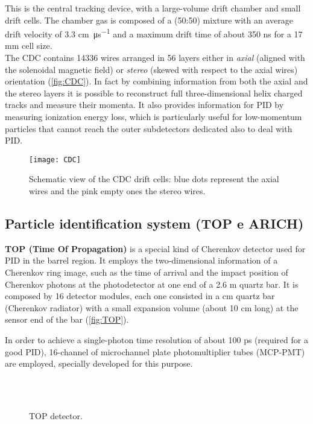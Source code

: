 This is the central tracking device, with a large-volume drift chamber and small drift cells. The chamber gas is composed of a  (50:50) mixture with an average drift velocity of 3.3 \unit{\centi\meter.\micro\second^{-1}} and a maximum drift time of about 350 ns for a 17 mm cell size.\\
The CDC contains 14336 wires arranged in 56 layers either in \emph{axial}  (aligned with the solenoidal magnetic field) or \emph{stereo} (skewed with respect to the axial wires) orientation (\autoref{fig:CDC}). 
In fact by combining information from both the axial and the stereo layers it is possible to reconstruct full three-dimensional helix charged tracks and measure their momenta.
It also provides information for PID by measuring ionization energy loss, which is particularly useful for low-momentum particles that cannot reach the outer subdetectors dedicated also to deal with PID.

\begin{figure}[h!]
\centering
\texttt{[image: CDC]}
\caption{Schematic view of the CDC drift cells: blue dots represent the axial wires and the pink empty ones the stereo wires.}
\label{fig:CDC}
\end{figure}


\subsection{Particle identification system (TOP e ARICH)}

\textbf{TOP (Time Of Propagation)} is a special kind of Cherenkov detector used for PID in the barrel region. It employs the two-dimensional information of a Cherenkov ring image, such as the time of arrival and the impact position of Cherenkov photons at the photodetector at one end of a 2.6 m quartz bar. It is composed by 16 detector modules, each one consisted in a  cm quartz bar (Cherenkov radiator) with a small expansion volume (about 10 cm long) at the sensor end of the bar (\autoref{fig:TOP}). 

In order to achieve a single-photon time resolution of about 100 ps (required for a good PID), 16-channel of microchannel plate photomultiplier tubes (MCP-PMT) are employed, specially developed for this purpose.\\

\begin{figure}[h!]
\centering
{}\\
\\
\caption{TOP detector.}
\label{fig:TOP}
\end{figure}

